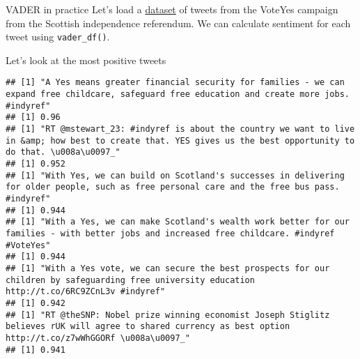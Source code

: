 \documentclass[
  10pt,
  ignorenonframetext,
  aspectratio=169]{beamer}
\newenvironment{Shaded}{\begin{snugshade}}{\end{snugshade}}
\newcommand{\AttributeTok}[1]{\textcolor[rgb]{0.80,0.80,0.80}{#1}}
\newcommand{\ConstantTok}[1]{\textcolor[rgb]{0.86,0.64,0.64}{\textbf{#1}}}
\newcommand{\ControlFlowTok}[1]{\textcolor[rgb]{0.94,0.87,0.69}{#1}}
\newcommand{\FunctionTok}[1]{\textcolor[rgb]{0.94,0.94,0.56}{#1}}
\newcommand{\NormalTok}[1]{\textcolor[rgb]{0.80,0.80,0.80}{#1}}
\newcommand{\OtherTok}[1]{\textcolor[rgb]{0.94,0.94,0.56}{#1}}
\newcommand{\SpecialCharTok}[1]{\textcolor[rgb]{0.86,0.64,0.64}{#1}}
\newcommand{\StringTok}[1]{\textcolor[rgb]{0.80,0.58,0.58}{#1}}
\begin{document}
\begin{frame}[fragile]{VADER in practice}
\protect\hypertarget{vader-in-practice}{}
Let's load a \href{https://doi.org/10.7910/DVN/RQ7P1F}{dataset} of
tweets from the VoteYes campaign from the Scottish independence
referendum. We can calculate sentiment for each tweet using
\texttt{vader\_df()}.

Let's look at the most positive tweets

\medskip
\scriptsize

\begin{Shaded}
\end{Shaded}

\begin{verbatim}
## [1] "A Yes means greater financial security for families - we can expand free childcare, safeguard free education and create more jobs. #indyref"
## [1] 0.96
## [1] "RT @mstewart_23: #indyref is about the country we want to live in &amp; how best to create that. YES gives us the best opportunity to do that. \u008a\u0097_"
## [1] 0.952
## [1] "With Yes, we can build on Scotland's successes in delivering for older people, such as free personal care and the free bus pass. #indyref"
## [1] 0.944
## [1] "With a Yes, we can make Scotland's wealth work better for our families - with better jobs and increased free childcare. #indyref #VoteYes"
## [1] 0.944
## [1] "With a Yes vote, we can secure the best prospects for our children by safeguarding free university education http://t.co/6RC9ZCnL3v #indyref"
## [1] 0.942
## [1] "RT @theSNP: Nobel prize winning economist Joseph Stiglitz believes rUK will agree to shared currency as best option http://t.co/z7wWhGGORf \u008a\u0097_"
## [1] 0.941
\end{verbatim}
\end{frame}
\end{document}
